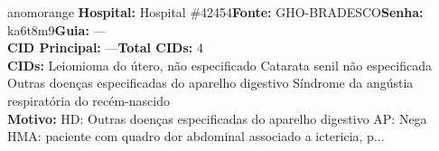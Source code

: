 \documentclass[a4paper,10pt]{article}
\begin{document}
\begin{anomalycard}[Interna\c{c}\~{a}o \#120743 | Pac. \#93202 | ALTO (z=3.13) | LOS: 2d | 10/03/2026\,$\to$\,12/03/2026]{anomorange}
\textbf{Hospital:} Hospital \#42454\quad \textbf{Fonte:} GHO-BRADESCO\quad \textbf{Senha:} ka6t8m9\quad \textbf{Guia:} ---\\

\textbf{CID Principal:} {\small ---}\quad\textbf{Total CIDs:} 4\\

\textbf{CIDs:} {\scriptsize Leiomioma do útero, não especificado \textbar{} Catarata senil não especificada \textbar{} Outras doenças especificadas do aparelho digestivo \textbar{} Síndrome da angústia respiratória do recém-nascido}\\

\textbf{Motivo:} {\scriptsize HD: Outras doenças especificadas do aparelho digestivo  AP: Nega HMA: paciente com quadro dor abdominal associado a ictericia, p...}\\



\end{anomalycard}
\end{document}
